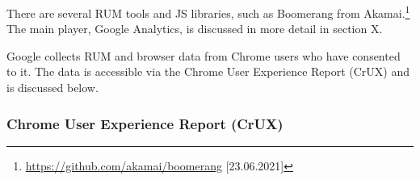 
There are several RUM tools and JS libraries, such as Boomerang from Akamai.\footnote{\url{https://github.com/akamai/boomerang} [23.06.2021]}
The main player, Google Analytics, is discussed in more detail in section X.




Google collects RUM and browser data from Chrome users who have consented to it.
The data is accessible via the Chrome User Experience Report (CrUX) and is discussed below.












\subsubsection{Chrome User Experience Report (CrUX)} %

